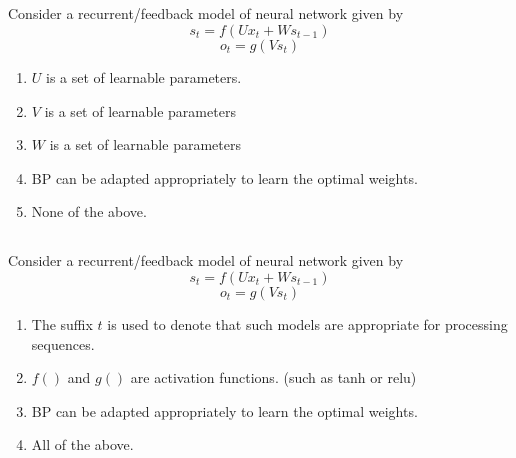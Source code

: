 \begin{frame}
\section{}

Consider a recurrent/feedback model of neural network given by
\[ s_t = f(Ux_t + W s_{t-1}) \]
\[ o_t = g(V s_t) \]

\begin{enumerate}[label=(\Alph*)]
\item $U$ is a set of learnable parameters.   %
\item $V$ is a set of learnable parameters    %
\item $W$ is a set of learnable parameters    %
\item BP can be adapted appropriately to learn the optimal weights.   %
\item None of the above.   %
\end{enumerate}
\end{frame}


\begin{frame}
\section{}
Consider a recurrent/feedback model of neural network given by
\[ s_t = f(Ux_t + W s_{t-1}) \]
\[ o_t = g(V s_t) \]

\begin{enumerate}[label=(\Alph*)]
\item The suffix $t$ is used to denote that such models are appropriate for processing sequences.
\item $f()$ and $g()$ are activation functions. (such as tanh or relu)
\item BP can be adapted appropriately to learn the optimal weights.
\item All of the above.   %
\end{enumerate}
\end{frame}
